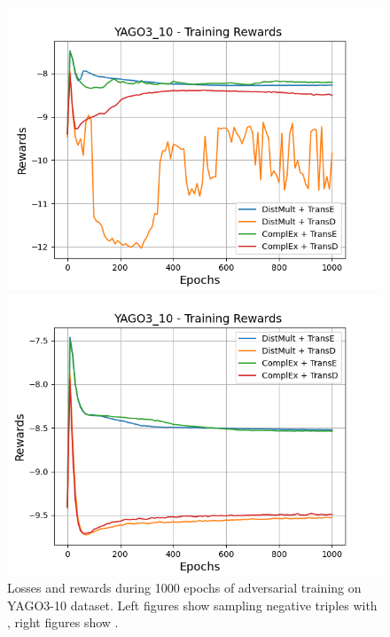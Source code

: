 \begin{figure}[H]
\begin{minipage}{.45\textwidth}
      \includegraphics[width=0.9\linewidth]{figures/results/gan_train/not_pretrained/uncertainty/max/entropy/yago3_10/1k_epochs/uncertainty_yago3_10_rew.png}
    \end{minipage}%
    \begin{minipage}{.45\textwidth}
      \centering
      \includegraphics[width=0.9\linewidth]{figures/results/gan_train/not_pretrained/uncertainty/max_distribution/entropy/yago3_10/1k_epochs/uncertainty_yago3_10_rew.png}
    \end{minipage}%
    \caption{Losses and rewards during 1000 epochs of adversarial training on \textsc{YAGO3-10} dataset. 
    Left figures show sampling negative triples with \usmax, right figures show \ussoftmax.}
    \label{fig:advtrain_yago3_10_usmax_ussoftmax_losses_rewards}
\end{figure}